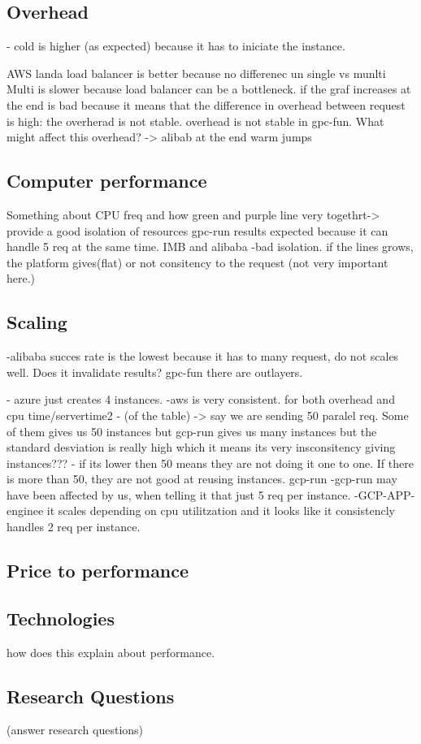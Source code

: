 \documentclass[11pt]{article}
\begin{document}
\subsection{Overhead}
- cold is higher (as expected) because it has to iniciate the instance. 


AWS landa load balancer is better because no differenec un single vs munlti
Multi is slower because load balancer can be a bottleneck.
if the graf increases at the end is bad because it means that the difference in overhead between request is high: the overherad is not stable. overhead is not stable in gpc-fun.
What might affect this overhead? -> 
alibab at the end warm jumps  


\subsection{Computer performance}
Something about CPU freq and how 
green and purple line very togethrt-> provide a good isolation of resources
gpc-run results expected because it can handle 5 req at the same time. 
IMB and alibaba -bad isolation.
if the lines grows, the platform gives(flat) or not consitency to the request (not very important here.)



\subsection{Scaling}

-alibaba succes rate is the lowest because it has to many request, do not scales well. Does it invalidate results?
gpc-fun there are outlayers. 

- azure just creates 4 instances. 
-aws is very consistent. for both overhead and cpu time/servertime2
- (of the table) -> say we are sending 50 paralel req. Some of them gives us 50 instances but gcp-run gives us many instances but the standard desviation is really high which it means its very insconsitency giving instances???
- if its lower then 50 means they are not doing it one to one. If there is more than 50, they are not good at reusing instances. gcp-run 
-gcp-run may have been affected by us, when telling it that just 5 req per instance. 
-GCP-APP-enginee it scales depending on cpu utilitzation and it looks like it consistencly handles 2 req per instance. 

\subsection{Price to performance}


\subsection{Technologies}
how does this explain about performance. 

\subsection{Research Questions}
(answer research questions)
\end{document}
